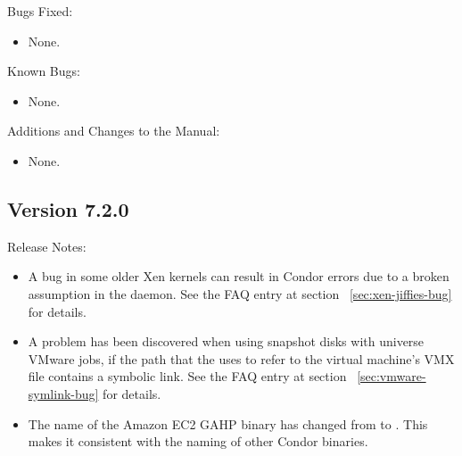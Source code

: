 \noindent Bugs Fixed:

\begin{itemize}

\item None.

\end{itemize}

\noindent Known Bugs:

\begin{itemize}

\item None.

\end{itemize}

\noindent Additions and Changes to the Manual:

\begin{itemize}

\item None.

\end{itemize}



\subsection*{\label{sec:New-7-2-0}Version 7.2.0}

\noindent Release Notes:

\begin{itemize}

\item A bug in some older Xen kernels can result in Condor errors
due to a broken assumption in the  daemon.
See the FAQ entry at section~ \ref{sec:xen-jiffies-bug} for details.

\item A problem has been discovered when using snapshot disks with 
 universe VMware jobs,
if the path that the  uses to refer to the
virtual machine's VMX file contains a symbolic link.
See the FAQ entry at section~ \ref{sec:vmware-symlink-bug} for details.

\item The name of the Amazon EC2 GAHP binary has changed from
 to . This makes it consistent
with the naming of other Condor binaries.

\end{itemize}


